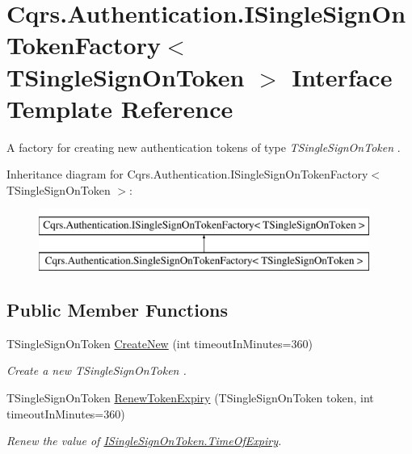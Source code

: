 \hypertarget{interfaceCqrs_1_1Authentication_1_1ISingleSignOnTokenFactory}{}\section{Cqrs.\+Authentication.\+I\+Single\+Sign\+On\+Token\+Factory$<$ T\+Single\+Sign\+On\+Token $>$ Interface Template Reference}
\label{interfaceCqrs_1_1Authentication_1_1ISingleSignOnTokenFactory}


A factory for creating new authentication tokens of type {\itshape T\+Single\+Sign\+On\+Token} .  


Inheritance diagram for Cqrs.\+Authentication.\+I\+Single\+Sign\+On\+Token\+Factory$<$ T\+Single\+Sign\+On\+Token $>$\+:\begin{figure}[H]
\begin{center}
\leavevmode
\includegraphics[height=2.000000cm]{interfaceCqrs_1_1Authentication_1_1ISingleSignOnTokenFactory}
\end{center}
\end{figure}
\subsection*{Public Member Functions}
\begin{DoxyCompactItemize}
\item 
T\+Single\+Sign\+On\+Token \hyperlink{interfaceCqrs_1_1Authentication_1_1ISingleSignOnTokenFactory_ad0795fb60ca13dd24db18556089e2834_ad0795fb60ca13dd24db18556089e2834}{Create\+New} (int timeout\+In\+Minutes=360)
\begin{DoxyCompactList}\small\item\em Create a new {\itshape T\+Single\+Sign\+On\+Token} . \end{DoxyCompactList}\item 
T\+Single\+Sign\+On\+Token \hyperlink{interfaceCqrs_1_1Authentication_1_1ISingleSignOnTokenFactory_ab436004ad1631140f7a58927cbacd8c4_ab436004ad1631140f7a58927cbacd8c4}{Renew\+Token\+Expiry} (T\+Single\+Sign\+On\+Token token, int timeout\+In\+Minutes=360)
\begin{DoxyCompactList}\small\item\em Renew the value of \hyperlink{interfaceCqrs_1_1Authentication_1_1ISingleSignOnToken_a50af484569cc78f88acb01f1938a7cd8_a50af484569cc78f88acb01f1938a7cd8}{I\+Single\+Sign\+On\+Token.\+Time\+Of\+Expiry}. \end{DoxyCompactList}\end{DoxyCompactItemize}


